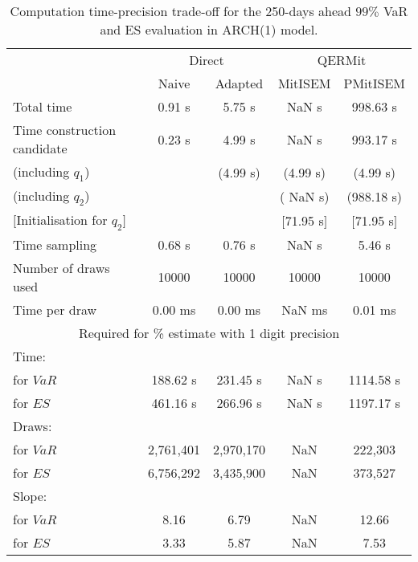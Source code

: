 { \renewcommand{\arraystretch}{1.3} 
\begin{table}[h] 
\centering 
\caption{Computation time-precision trade-off for the 250-days ahead  $99\%$ VaR and ES evaluation in ARCH(1) model.} 
\label{tab:time_precision_arch} 
\begin{tabular}{lcccc}  
  & \multicolumn{2}{c}{Direct} & \multicolumn{2}{c}{QERMit}  \\ \cline{2-5} 
  & Naive & Adapted & MitISEM & PMitISEM  \\ \hline 
Total time & 0.91 s & 5.75 s &  NaN s & 998.63 s \\ 
Time construction candidate & 0.23 s & 4.99 s &  NaN s & 993.17 s \\ 
 (including $q_{1}$) &   &  (4.99 s) & (4.99 s) & (4.99 s) \\ 
 (including $q_{2}$) &   &  & ( NaN s) & (988.18 s) \\ 
$[$Initialisation for $q_{2}$$]$&   &   & $[$71.95 s$]$ & $[$71.95 s$]$ \\ 
Time sampling & 0.68 s & 0.76 s &  NaN s & 5.46 s  \\  
Number of draws used & 10000 & 10000 & 10000 & 10000 \\ 
Time per draw & 0.00 ms & 0.00 ms &  NaN ms & 0.01 ms \\ \hline 
\multicolumn{5}{c}{Required for \% estimate with 1 digit precision} \\ \hline 
Time: &  &  &   &  \\ 
\hspace{1cm} for $VaR$ & 188.62 s & 231.45 s &  NaN s & 1114.58 s \\ 
\hspace{1cm} for $ES$ & 461.16 s & 266.96 s &  NaN s & 1197.17 s \\ 
Draws: &  &  &   &  \\ 
\hspace{1cm} for $VaR$ & 2,761,401 & 2,970,170  & NaN  & 222,303  \\ 
\hspace{1cm} for $ES$ & 6,756,292 & 3,435,900  & NaN   & 373,527  \\ 
\hline 
Slope: &  &  &   &  \\ 
\hspace{1cm} for $VaR$ & 8.16 & 6.79  &  NaN  & 12.66  \\ 
\hspace{1cm} for $ES$ & 3.33 & 5.87  &  NaN   & 7.53  \\  \hline 
\end{tabular} 
\end{table} 
} 
